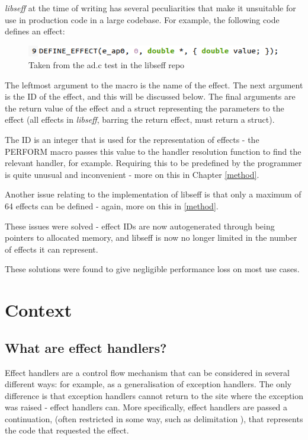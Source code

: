 \documentclass[logo,bsc,singlespacing,parskip,online]{infthesis}
\begin{document}
\textit{libseff} at the time of writing has several peculiarities that make it unsuitable for use in production code in a large codebase. For example, the following code defines an effect: 
\begin{figure}[h]
    \centering
    \includegraphics[width=0.9\linewidth]{eff_def.png}
    \caption{Taken from the ad.c test in the libseff repo}
\end{figure}

The leftmost argument to the macro is the name of the effect. The next argument is the ID of the effect, and this will be discussed below. The final arguments are the return value of the effect and a struct representing the parameters to the effect (all effects in \textit{libseff}, barring the return effect, must return a struct).

The ID is an integer that is used for the representation of effects - the PERFORM macro passes this value to the handler resolution function to find the relevant handler, for example. Requiring this to be predefined by the programmer is quite unusual and inconvenient - more on this in Chapter \ref{method}.

Another issue relating to the implementation of libseff is that only a maximum of 64 effects can be defined - again, more on this in \ref{method}.

These issues were solved - effect IDs are now autogenerated through being pointers to allocated memory, and libseff is now no longer limited in the number of effects it can represent.

These solutions were found to give negligible performance loss on most use cases.





\chapter{Context} \label{background}

\section{What are effect handlers?}
Effect handlers are a control flow mechanism that can be considered in several different ways: for example, as a generalisation of exception handlers. \citep{sep-log} The only difference is that exception handlers cannot return to the site where the exception was raised - effect handlers can. More specifically, effect handlers are passed a continuation, (often restricted in some way, such as delimitation \citep{old-paper}), that represents the code that requested the effect.
\end{document}
